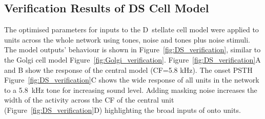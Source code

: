 \clearpage
\subsection{Verification Results of DS Cell Model}    \label{sec:DS:verification}


The optimised parameters for inputs to the D~stellate cell model were applied to \DS units across the whole network using tones, noise and tones plus noise stimuli. 
The \DS model outputs' behaviour is shown in Figure~\ref{fig:DS_verification}, similar to the Golgi cell model Figure~\ref{fig:Golgi_verification}. 
Figure~\ref{fig:DS_verification}A and B show the response of the central \DS model (CF=5.8 kHz). The onset PSTH 
Figure~\ref{fig:DS_verification}C shows the wide response of all \DS units in the network to a 5.8~kHz tone for increasing sound level. 
Adding masking noise increases the width of the activity across the CF of the central unit (Figure~\ref{fig:DS_verification}D) highlighting the broad inputs of \ANFs onto \DS units.


